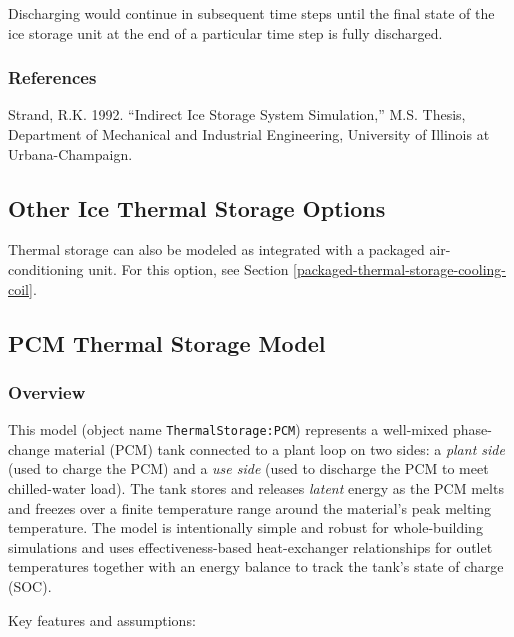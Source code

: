 Discharging would continue in subsequent time steps until the final state of the ice storage unit at the end of a particular time step is fully discharged.

\subsubsection{References}\label{references-1-011}

Strand, R.K. 1992. ``Indirect Ice Storage System Simulation,'' M.S. Thesis, Department of Mechanical and Industrial Engineering, University of Illinois at Urbana-Champaign.

\subsection{Other Ice Thermal Storage Options}

Thermal storage can also be modeled as integrated with a packaged air-conditioning unit. For this option, see Section \ref{packaged-thermal-storage-cooling-coil}.

\subsection{PCM Thermal Storage Model}\label{pcm-thermal-storage-model}

\subsubsection{Overview}\label{pcm-overview}

This model (object name \texttt{ThermalStorage:PCM}) represents a well-mixed phase-change material (PCM) tank connected to a plant loop on two sides: a \emph{plant side} (used to charge the PCM) and a \emph{use side} (used to discharge the PCM to meet chilled-water load). The tank stores and releases \emph{latent} energy as the PCM melts and freezes over a finite temperature range around the material’s peak melting temperature. The model is intentionally simple and robust for whole-building simulations and uses effectiveness-based heat-exchanger relationships for outlet temperatures together with an energy balance to track the tank’s state of charge (SOC).

Key features and assumptions:

